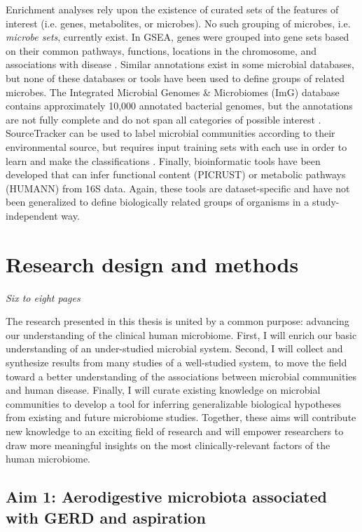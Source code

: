 \documentclass[12pt]{article}
\begin{document}
Enrichment analyses rely upon the existence of curated sets of the features of interest (i.e. genes, metabolites, or microbes).
No such grouping of microbes, i.e. \textit{microbe sets}, currently exist. 
In GSEA, genes were grouped into gene sets based on their common 
pathways, functions, locations in the chromosome, and associations 
with disease \cite{subramanian-gsea-2005}. Similar annotations exist in some microbial databases, 
but none of these databases or tools have been used to define groups 
of related microbes. The Integrated Microbial Genomes \& Microbiomes (ImG) 
database contains approximately 10,000 annotated 
bacterial genomes, but the annotations are not fully complete and do 
not span all categories of possible interest \cite{markowitz-img-2013}. SourceTracker 
can be used to label microbial communities according to their 
environmental source, but requires input training sets with each use 
in order to learn and make the classifications \cite{knights-sourcetracker-2011}. 
Finally, bioinformatic tools have been developed that can infer functional 
content (PICRUST) \cite{langille-picrust-2013} or metabolic pathways 
(HUMANN) \cite{abubucker-humann-2012} from 16S data. Again, 
these tools are dataset-specific and have not been generalized to 
define biologically related groups of organisms in a study-independent way.

\section{Research design and methods}
\textit{Six to eight pages}

The research presented in this thesis is united by a common purpose: 
advancing our understanding of the clinical human microbiome.
First, I will enrich our basic understanding of an under-studied 
microbial system. Second, I will collect and synthesize 
results from many studies of a well-studied system, to move the 
field toward a better understanding of the associations between 
microbial communities and human disease. Finally, I will curate
existing knowledge on microbial communities to develop a tool for 
inferring generalizable biological hypotheses from existing and future 
microbiome studies. Together, these aims will contribute new knowledge
to an exciting field of research and will empower researchers to draw 
more meaningful insights on the most clinically-relevant factors of
the human microbiome.

\subsection{Aim 1: Aerodigestive microbiota associated with GERD and aspiration}
\end{document}
